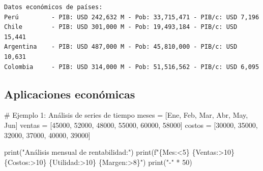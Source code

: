 \documentclass[
  doc,
  floatsintext,
  longtable,
  a4paper,
  nolmodern,
  notxfonts,
  notimes,
  12pt,
  colorlinks=true,linkcolor=blue,citecolor=blue,urlcolor=blue]{apa7}
\newenvironment{Shaded}{\begin{snugshade}}{\end{snugshade}}
\newcommand{\BuiltInTok}[1]{\textcolor[rgb]{0.00,0.23,0.31}{#1}}
\newcommand{\CommentTok}[1]{\textcolor[rgb]{0.37,0.37,0.37}{#1}}
\newcommand{\DecValTok}[1]{\textcolor[rgb]{0.68,0.00,0.00}{#1}}
\newcommand{\NormalTok}[1]{\textcolor[rgb]{0.00,0.23,0.31}{#1}}
\newcommand{\OperatorTok}[1]{\textcolor[rgb]{0.37,0.37,0.37}{#1}}
\newcommand{\SpecialCharTok}[1]{\textcolor[rgb]{0.37,0.37,0.37}{#1}}
\newcommand{\SpecialStringTok}[1]{\textcolor[rgb]{0.13,0.47,0.30}{#1}}
\newcommand{\StringTok}[1]{\textcolor[rgb]{0.13,0.47,0.30}{#1}}
\begin{document}
\begin{verbatim}
Datos económicos de países:
Perú         - PIB: USD 242,632 M - Pob: 33,715,471 - PIB/c: USD 7,196
Chile        - PIB: USD 301,000 M - Pob: 19,493,184 - PIB/c: USD 15,441
Argentina    - PIB: USD 487,000 M - Pob: 45,810,000 - PIB/c: USD 10,631
Colombia     - PIB: USD 314,000 M - Pob: 51,516,562 - PIB/c: USD 6,095
\end{verbatim}

\subsection{Aplicaciones económicas}\label{aplicaciones-econuxf3micas-2}

\begin{Shaded}
\begin{Highlighting}[]
\CommentTok{\# Ejemplo 1: Análisis de series de tiempo}
\NormalTok{meses }\OperatorTok{=}\NormalTok{ [}\StringTok{\textquotesingle{}Ene\textquotesingle{}}\NormalTok{, }\StringTok{\textquotesingle{}Feb\textquotesingle{}}\NormalTok{, }\StringTok{\textquotesingle{}Mar\textquotesingle{}}\NormalTok{, }\StringTok{\textquotesingle{}Abr\textquotesingle{}}\NormalTok{, }\StringTok{\textquotesingle{}May\textquotesingle{}}\NormalTok{, }\StringTok{\textquotesingle{}Jun\textquotesingle{}}\NormalTok{]}
\NormalTok{ventas }\OperatorTok{=}\NormalTok{ [}\DecValTok{45000}\NormalTok{, }\DecValTok{52000}\NormalTok{, }\DecValTok{48000}\NormalTok{, }\DecValTok{55000}\NormalTok{, }\DecValTok{60000}\NormalTok{, }\DecValTok{58000}\NormalTok{]}
\NormalTok{costos }\OperatorTok{=}\NormalTok{ [}\DecValTok{30000}\NormalTok{, }\DecValTok{35000}\NormalTok{, }\DecValTok{32000}\NormalTok{, }\DecValTok{37000}\NormalTok{, }\DecValTok{40000}\NormalTok{, }\DecValTok{39000}\NormalTok{]}

\BuiltInTok{print}\NormalTok{(}\StringTok{"Análisis mensual de rentabilidad:"}\NormalTok{)}
\BuiltInTok{print}\NormalTok{(}\SpecialStringTok{f"}\SpecialCharTok{\{}\StringTok{\textquotesingle{}Mes\textquotesingle{}}\SpecialCharTok{:\textless{}5\}}\SpecialStringTok{ }\SpecialCharTok{\{}\StringTok{\textquotesingle{}Ventas\textquotesingle{}}\SpecialCharTok{:\textgreater{}10\}}\SpecialStringTok{ }\SpecialCharTok{\{}\StringTok{\textquotesingle{}Costos\textquotesingle{}}\SpecialCharTok{:\textgreater{}10\}}\SpecialStringTok{ }\SpecialCharTok{\{}\StringTok{\textquotesingle{}Utilidad\textquotesingle{}}\SpecialCharTok{:\textgreater{}10\}}\SpecialStringTok{ }\SpecialCharTok{\{}\StringTok{\textquotesingle{}Margen\textquotesingle{}}\SpecialCharTok{:\textgreater{}8\}}\SpecialStringTok{"}\NormalTok{)}
\BuiltInTok{print}\NormalTok{(}\StringTok{"{-}"} \OperatorTok{*} \DecValTok{50}\NormalTok{)}


\end{Highlighting}
\end{Shaded}
\end{document}
